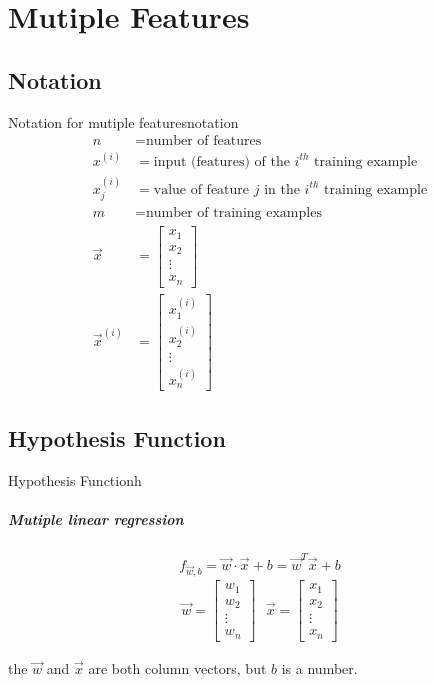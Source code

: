 \chapter{Mutiple Features}
\section{Notation}
\begin{exbox}{Notation for mutiple features}{notation}
    \begin{align*}
        n &= \text{number of features} \\
        x^{(i)} &= \text{input (features) of the $i^{th}$ training example} \\
        x_j^{(i)} &= \text{value of feature $j$ in the $i^{th}$ training example} \\
        m &= \text{number of training examples} \\
        \vec{x} &= \begin{bmatrix} x_1 \\ x_2 \\ \vdots \\ x_n \end{bmatrix} \\
        \vec{x}^{(i)} &= \begin{bmatrix} x_1^{(i)} \\ x_2^{(i)} \\ \vdots \\ x_n^{(i)} \end{bmatrix}
    \end{align*}
\end{exbox}

\section{Hypothesis Function}
\begin{dfnbox}{Hypothesis Function}{h}
\paragraph*{Mutiple linear regression}
\begin{equation}
    f_{\vec{w}, b} = \vec{w} \cdot \vec{x} + b =\vec{w}^T \vec{x} + b
\end{equation}
\tcblower
\begin{align*}
    \vec{w} = \begin{bmatrix} w_1 \\ w_2 \\ \vdots \\ w_n \end{bmatrix} \ \ \
    \vec{x} = \begin{bmatrix} x_1 \\ x_2 \\ \vdots \\ x_n \end{bmatrix}
\end{align*}
\begin{notebox}
    the $\vec{w}$ and $\vec{x}$ are both column vectors, %
    but $b$ is a number.
\end{notebox}
\end{dfnbox}

